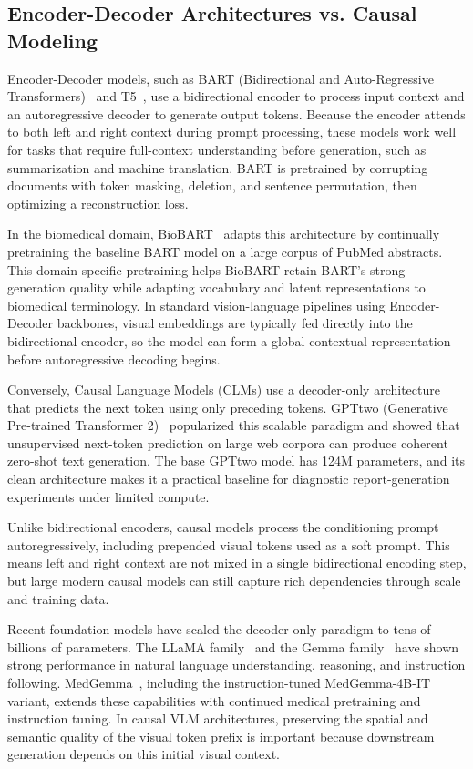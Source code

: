 \subsection{Encoder-Decoder Architectures vs. Causal Modeling}

Encoder-Decoder models, such as BART (Bidirectional and Auto-Regressive Transformers)~\cite{lewis2019bart} and T5~\cite{raffel2023exploringlimitstransferlearning}, use a bidirectional encoder to process input context and an autoregressive decoder to generate output tokens. Because the encoder attends to both left and right context during prompt processing, these models work well for tasks that require full-context understanding before generation, such as summarization and machine translation. BART is pretrained by corrupting documents with token masking, deletion, and sentence permutation, then optimizing a reconstruction loss.

In the biomedical domain, BioBART~\cite{yuan2022biobart} adapts this architecture by continually pretraining the baseline BART model on a large corpus of PubMed abstracts. This domain-specific pretraining helps BioBART retain BART's strong generation quality while adapting vocabulary and latent representations to biomedical terminology. In standard vision-language pipelines using Encoder-Decoder backbones, visual embeddings are typically fed directly into the bidirectional encoder, so the model can form a global contextual representation before autoregressive decoding begins.

Conversely, Causal Language Models (CLMs) use a decoder-only architecture that predicts the next token using only preceding tokens. \ac{GPTtwo} (Generative Pre-trained Transformer 2)~\cite{radford2019language} popularized this scalable paradigm and showed that unsupervised next-token prediction on large web corpora can produce coherent zero-shot text generation. The base \ac{GPTtwo} model has 124M parameters, and its clean architecture makes it a practical baseline for diagnostic report-generation experiments under limited compute.

Unlike bidirectional encoders, causal models process the conditioning prompt autoregressively, including prepended visual tokens used as a soft prompt. This means left and right context are not mixed in a single bidirectional encoding step, but large modern causal models can still capture rich dependencies through scale and training data.

Recent foundation models have scaled the decoder-only paradigm to tens of billions of parameters. The LLaMA family~\cite{touvron2023llama} and the Gemma family~\cite{team2024gemma} have shown strong performance in natural language understanding, reasoning, and instruction following. MedGemma~\cite{yang2024medgemma}, including the instruction-tuned MedGemma-4B-IT variant, extends these capabilities with continued medical pretraining and instruction tuning. In causal VLM architectures, preserving the spatial and semantic quality of the visual token prefix is important because downstream generation depends on this initial visual context.

